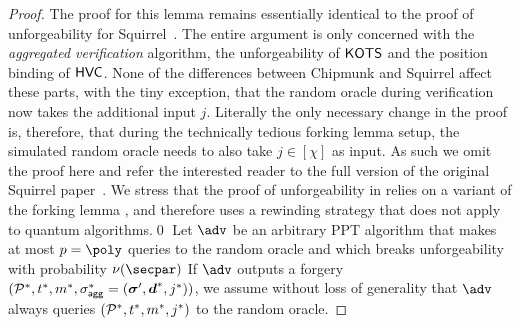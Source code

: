 \begin{proof}
  The proof for this lemma remains essentially identical to the proof of unforgeability for Squirrel~\cite{CCS:FleSimZha22}.
  The entire argument is only concerned with the \emph{aggregated verification} algorithm, the unforgeability of $\mathsf{KOTS}$ and the position binding of $\mathsf{HVC}$.
  None of the differences between Chipmunk and Squirrel affect these parts, with the tiny exception, that the random oracle during verification now takes the additional input $j$.
  Literally the only necessary change in the proof is, therefore, that during the technically tedious forking lemma setup, the simulated random oracle needs to also take $j\in[\chi]$ as input.
  As such we omit the proof here and refer the interested reader to the full version of the original Squirrel paper~\cite{EPRINT:FleSimZha22}.
  We stress that the proof of unforgeability in \cite{EPRINT:FleSimZha22} relies on a variant \cite{CCS:BelNev06} of the forking lemma \cite{EC:PoiSte96}, and therefore uses a rewinding strategy that does not apply to quantum algorithms.\qed
  \iffalse
  Let $\adv$ be an arbitrary PPT algorithm that makes at most $p=\poly$ queries to the random oracle and which breaks unforgeability with probability $\nu(\secpar)$
  If $\adv$ outputs a forgery $(\mathcal{P}^*,t^*,m^*,\sigma_\mathsf{agg}^*=(\boldsymbol{\sigma}',\boldsymbol{d}^*,j^*))$, we assume without loss of generality that $\adv$ always queries $(\mathcal{P}^*,t^*,m^*,j^*)$ to the random oracle.
  

\end{proof}
